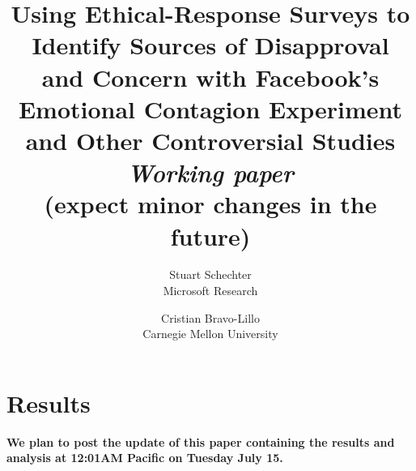 \documentclass[letterpaper,twocolumn,10pt]{article}
\begin{document}


\title{\Large
Using Ethical-Response Surveys to Identify Sources of Disapproval\\
and Concern with Facebook's Emotional Contagion Experiment\\
and Other Controversial Studies
\\
\vspace{.25in}
{\large \emph{Working paper} 
\\ \normalsize (expect minor changes in the future)}
}
\author{
{\rm Stuart Schechter}\\
\normalsize Microsoft Research
\and
{\rm Cristian Bravo-Lillo}\\
\normalsize Carnegie Mellon University
}





\twocolumn[
  \maketitle
  \begin{onecolabstract}

\vspace{.25in}
  \end{onecolabstract}
]
%
%
%
%
\pagebreak


\preview{


}
{
\section{Results}
\textbf{We plan to post the update of this paper containing the results and analysis at 12:01AM Pacific on Tuesday July 15.}

}
%
%
\balance


\clearpage\appendix
%

%
\end{document}
